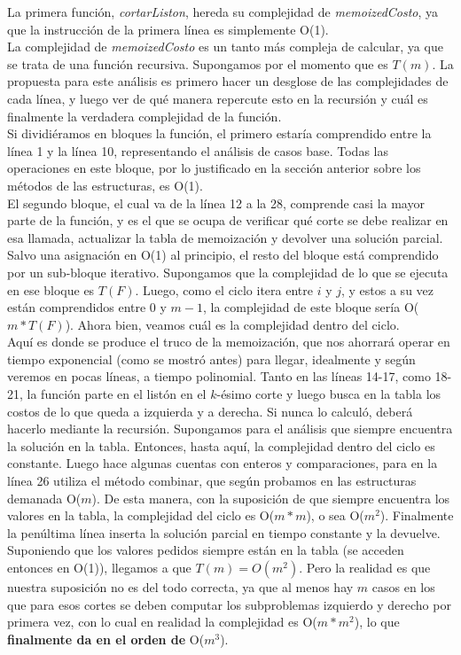 \indent La primera función, \textsl{cortarListon}, hereda su complejidad de \textsl{memoizedCosto}, ya que la instrucción de la primera línea es simplemente O(1).\\
\indent La complejidad de \textsl{memoizedCosto} es un tanto más compleja de calcular, ya que se trata de una función recursiva. Supongamos por el momento que es $T(m)$. La propuesta para este análisis es primero hacer un desglose de las complejidades de cada línea, y luego ver de qué manera repercute esto en la recursión y cuál es finalmente la verdadera complejidad de la función.\\
\indent Si dividiéramos en bloques la función, el primero estaría comprendido entre la línea 1 y la línea 10, representando el análisis de casos base. Todas las operaciones en este bloque, por lo justificado en la sección anterior sobre los métodos de las estructuras, es O(1).\\
\indent El segundo bloque, el cual va de la línea 12 a la 28, comprende casi la mayor parte de la función, y es el que se ocupa de verificar qué corte se debe realizar en esa llamada, actualizar la tabla de memoización y devolver una solución parcial. Salvo una asignación en O(1) al principio, el resto del bloque está comprendido por un sub-bloque iterativo. Supongamos que la complejidad de lo que se ejecuta en ese bloque es $T(F)$. Luego, como el ciclo itera entre $i$ y $j$, y estos a su vez están comprendidos entre $0$ y $m-1$, la complejidad de este bloque sería O($m * T(F)$). Ahora bien, veamos cuál es la complejidad dentro del ciclo.\\
\indent Aquí es donde se produce el truco de la memoización, que nos ahorrará operar en tiempo exponencial (como se mostró antes) para llegar, idealmente y según veremos en pocas líneas, a tiempo polinomial. Tanto en las líneas 14-17, como 18-21, la función parte en el listón en el $k$-ésimo corte y luego busca en la tabla los costos de lo que queda a izquierda y a derecha. Si nunca lo calculó, deberá hacerlo mediante la recursión. Supongamos para el análisis que siempre encuentra la solución en la tabla. Entonces, hasta aquí, la complejidad dentro del ciclo es constante. Luego hace algunas cuentas con enteros y comparaciones, para en la línea 26 utiliza el método combinar, que según probamos en las estructuras demanada O($m$). De esta manera, con la suposición de que siempre encuentra los valores en la tabla, la complejidad del ciclo es O($m * m$), o sea O($m^2$). Finalmente la penúltima línea inserta la solución parcial en tiempo constante y la devuelve.\\
\indent Suponiendo que los valores pedidos siempre están en la tabla (se acceden entonces en O(1)), llegamos a que $T(m) = O(m^2)$. Pero la realidad es que nuestra suposición no es del todo correcta, ya que al menos hay $m$ casos en los que para esos cortes se deben computar los subproblemas izquierdo y derecho por primera vez, con lo cual en realidad la complejidad es O($m * m^2$), lo que \textbf{finalmente da en el orden de} O($m^3$).


